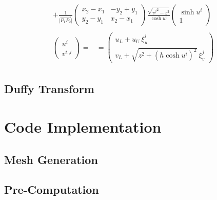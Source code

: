 \documentclass [10pt,letterpaper]{article}
\begin{document}
\begin{subequations}
\begin{align}
\begin{split}
			+
			\frac{1}{\lvert \overrightarrow{P_1 P_2} \rvert}
			\begin{pmatrix} 
				x_2-x_1 	& 	-y_2+y_1	\\
				y_2-y_1 	& 	x_2-x_1		
			\end{pmatrix}
			\frac{ \sqrt{{v^j}^2-z^2} } { \cosh{u^i} } 
			\begin{pmatrix}
				\sinh{u^i}				\\
				1
			\end{pmatrix}
		\end{split}
		\\
		\begin{split} 
			\begin{pmatrix}
				u^i					\\
				v^{i,j}
			\end{pmatrix}
			=&
			=
			\begin{pmatrix} 
				u_L
				+ 
				u_U
				\ \xi_u^i				\\
				v_L
				+ 
				\sqrt{ z^2 + (h \cosh{u^i})^2 }
				\ \xi_v^j				
			\end{pmatrix}
		\end{split}
	\end{align}
\end{subequations}

\subsection{Duffy Transform}
\label{sub:duffy-transform}






\section{Code Implementation}
\label{sec:code-implementation}
\subsection{Mesh Generation}
\label{sub:mesh-generation}
\subsection{Pre-Computation}
\label{sub:pre-computation}
\end{document}
